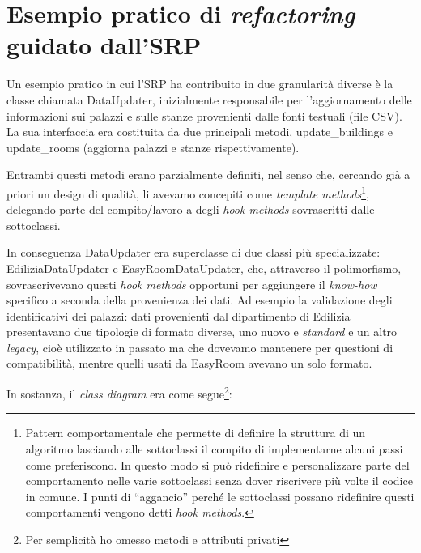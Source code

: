 \documentclass[12pt]{report}
\begin{document}
\section{Esempio pratico di \textit{refactoring} guidato dall'SRP}

Un esempio pratico in cui l'SRP ha contribuito in due granularità diverse è la
classe chiamata DataUpdater, inizialmente responsabile per l'aggiornamento 
delle informazioni sui palazzi e sulle stanze provenienti dalle fonti testuali 
(file CSV). La sua interfaccia era costituita da due principali 
metodi, update\_buildings e update\_rooms (aggiorna palazzi e stanze 
rispettivamente).

Entrambi questi metodi erano parzialmente definiti, nel senso che, cercando già
a priori un design di qualità, li avevamo concepiti come
\textit{template methods}\footnote{
Pattern comportamentale che permette di 
definire la struttura di un algoritmo lasciando alle sottoclassi il compito di 
implementarne alcuni passi come preferiscono. In questo modo si può ridefinire 
e personalizzare parte del comportamento nelle varie sottoclassi senza dover 
riscrivere più volte il codice in comune. I punti di ``aggancio'' perché le 
sottoclassi possano ridefinire questi comportamenti vengono detti 
\textit{hook methods}.
},
delegando parte del compito/lavoro a degli \textit{hook methods} sovrascritti
dalle sottoclassi.

In conseguenza DataUpdater era superclasse di due classi più specializzate: 
EdiliziaDataUpdater e EasyRoomDataUpdater, che, attraverso il polimorfismo,
sovrascrivevano questi \textit{hook methods} opportuni per aggiungere 
il \textit{know-how} specifico a seconda della provenienza dei dati. 
Ad esempio la validazione degli identificativi dei palazzi: 
dati provenienti dal dipartimento di Edilizia presentavano due
tipologie di formato diverse, uno nuovo e \textit{standard} e un altro 
\textit{legacy}, cioè utilizzato in passato ma che dovevamo mantenere per
questioni di compatibilità, mentre quelli usati da EasyRoom avevano un solo formato.

In sostanza, il \textit{class diagram} era come segue\footnote{Per 
semplicità ho omesso metodi e attributi privati}:
\end{document}
